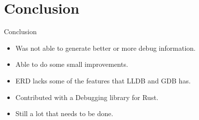 \section{Conclusion}

\begin{frame}{Conclusion}
    \begin{itemize}
	\item Was not able to generate better or more debug information.
        \item Able to do some small improvements.
        \item ERD lacks some of the features that LLDB and GDB has.
        \item Contributed with a Debugging library for Rust.
        \item Still a lot that needs to be done.
    \end{itemize}
\end{frame}




